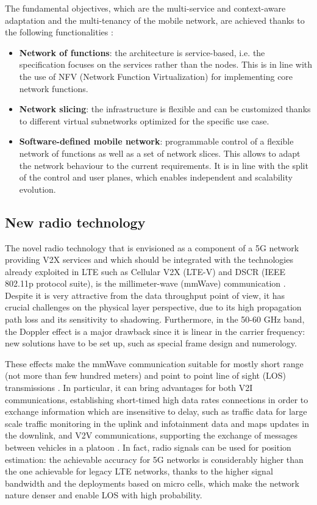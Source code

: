 \documentclass[conference,12pt,onecolumn]{IEEEtran}
\begin{document}
The fundamental objectives, which are the multi-service and context-aware adaptation and the multi-tenancy of the mobile network, are achieved thanks to the following functionalities \cite{rost2016mobile}:
\begin{itemize}
\item \textbf{Network of functions}: the architecture is service-based, i.e. the specification focuses on the services rather than the nodes. This is in  line with the use of NFV (Network Function Virtualization) for implementing core network functions.
\item \textbf{Network slicing}: the infrastructure is flexible and can be customized thanks to different virtual subnetworks optimized for the specific use case.
\item \textbf{Software-defined mobile network}: programmable control of a flexible network of functions as well as a set of network slices. This allows to adapt the network behaviour to the current requirements. It is in line with the split of the control and user planes, which enables independent and scalability evolution.
\end{itemize}

\subsection*{New radio technology}
The novel radio technology that is envisioned as a component of a 5G network providing V2X services and which should be integrated with the technologies already exploited in LTE such as Cellular V2X (LTE-V) and DSCR (IEEE 802.11p protocol suite), is the millimeter-wave (mmWave) communication \cite{boban2017}. Despite it is very attractive from the data throughput point of view, it has crucial challenges on the physical layer perspective, due to its high propagation path loss and its sensitivity to shadowing. Furthermore, in the 50-60 GHz band, the Doppler effect is a major drawback since it is linear in the carrier frequency: new solutions have to be set up, such as special frame design and numerology. 

These effects make the mmWave communication suitable for mostly short range (not more than few hundred meters) and point to point line of sight (LOS) transmissions \cite{rangan2014millimeter}. In particular, it can bring advantages for both V2I communications, establishing short-timed high data rates connections in order to exchange information which are insensitive to delay, such as traffic data for large scale traffic monitoring in the uplink and infotainment data and maps updates in the downlink, and V2V communications, supporting the exchange of messages between vehicles in a platoon \cite{va2016millimeter}. In fact, radio signals can be used for position estimation: the achievable accuracy for 5G networks is considerably higher than the one achievable for legacy LTE networks, thanks to the higher signal bandwidth and the deployments based on micro cells, which make the network nature denser and enable LOS with high probability.
\end{document}
